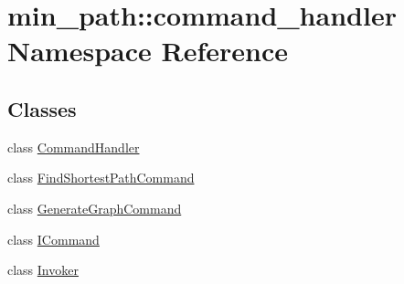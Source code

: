 \hypertarget{a00035}{}\section{min\+\_\+path\+:\+:command\+\_\+handler Namespace Reference}
\label{a00035}
\subsection*{Classes}
\begin{DoxyCompactItemize}
\item 
class \hyperlink{a00003}{Command\+Handler}
\item 
class \hyperlink{a00005}{Find\+Shortest\+Path\+Command}
\item 
class \hyperlink{a00006}{Generate\+Graph\+Command}
\item 
class \hyperlink{a00008}{I\+Command}
\item 
class \hyperlink{a00009}{Invoker}
\end{DoxyCompactItemize}
